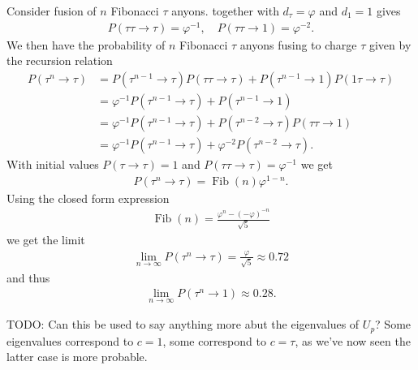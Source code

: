 \documentclass[a4paper,10pt,oneside]{book}
\theoremstyle{plain}
\theoremstyle{definition}
\theoremstyle{remark}
\DeclareMathOperator{\Fib}{Fib}
\begin{document}
Consider fusion of $n$ Fibonacci $τ$ anyons.  together with $d_τ = \varphi$ and $d_1 = 1$ gives
\begin{align*}
  P(ττ \to τ) = \varphi^{-1}, \quad P(ττ \to 1) = \varphi^{-2}.
\end{align*}
We then have the probability of $n$ Fibonacci $τ$ anyons fusing to charge $τ$ given by the recursion relation
\begin{align*}
  P(τ^n \to τ)
  &= P(τ^{n-1} \to τ) P(τ τ \to τ) + P(τ^{n-1} \to 1) P(1τ \to τ) \\
  &= \varphi^{-1} P(τ^{n-1} \to τ) + P(τ^{n-1} \to 1) \\
  &= \varphi^{-1} P(τ^{n-1} \to τ) + P(τ^{n-2} \to τ) P(ττ \to 1) \\
  &= \varphi^{-1} P(τ^{n-1} \to τ) + \varphi^{-2} P(τ^{n-2} \to τ).
\end{align*}
With initial values $P(τ \to τ) = 1$ and $P(ττ \to τ) = \varphi^{-1}$ we get
\begin{align*}
  P(τ^n \to τ) = \Fib(n) \varphi^{1-n}.
\end{align*}
Using the closed form expression
\begin{align*}
  \Fib(n) = \frac{\varphi^n-(-\varphi)^{-n}}{\sqrt{5}}
\end{align*}
we get the limit
\begin{align*}
  \lim_{n\to\infty} P(τ^n \to τ) = \frac{\varphi}{\sqrt{5}} \approx 0.72
\end{align*}
and thus
\begin{align*}
  \lim_{n\to\infty} P(τ^n \to 1) \approx 0.28.
\end{align*}



TODO: Can this be used to say anything more abut the eigenvalues of $U_p$? Some eigenvalues correspond to $c=1$, some correspond to $c=τ$, as we've now seen the latter case is more probable.




\end{document}
